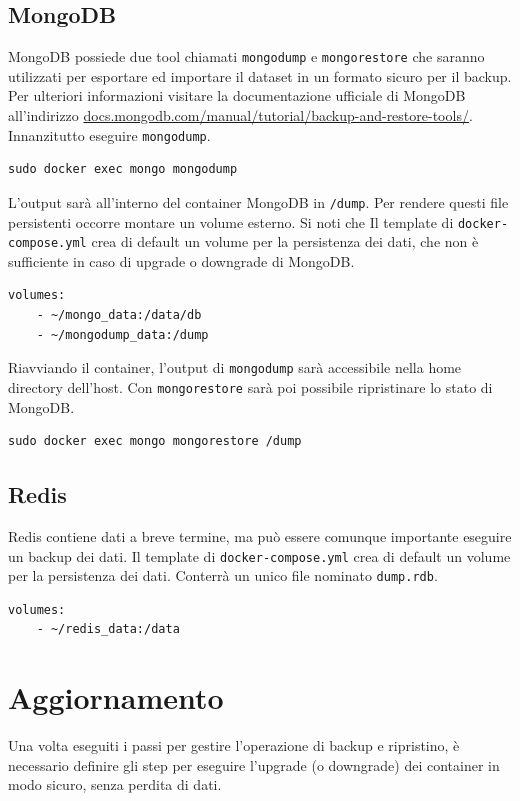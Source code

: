 \subsection{MongoDB}
MongoDB possiede due tool chiamati \verb|mongodump| e \verb|mongorestore| che saranno utilizzati per esportare ed importare il dataset in un formato sicuro per il backup. Per ulteriori informazioni visitare la documentazione ufficiale di MongoDB all'indirizzo \url{docs.mongodb.com/manual/tutorial/backup-and-restore-tools/}. Innanzitutto eseguire \verb|mongodump|.
\begin{lstlisting}
sudo docker exec mongo mongodump
\end{lstlisting}
L'output sarà all'interno del container MongoDB in \verb|/dump|. Per rendere questi file persistenti occorre montare un volume esterno. Si noti che Il template di \verb|docker-compose.yml| crea di default un volume per la persistenza dei dati, che non è sufficiente in caso di upgrade o downgrade di MongoDB.
\begin{lstlisting}
volumes:
    - ~/mongo_data:/data/db
    - ~/mongodump_data:/dump
\end{lstlisting}
Riavviando il container, l'output di \verb|mongodump| sarà accessibile nella home directory dell'host. Con \verb|mongorestore| sarà poi possibile ripristinare lo stato di MongoDB.
\begin{lstlisting}
sudo docker exec mongo mongorestore /dump
\end{lstlisting}

\subsection{Redis}
Redis contiene dati a breve termine, ma può essere comunque importante eseguire un backup dei dati. Il template di \verb|docker-compose.yml| crea di default un volume per la persistenza dei dati. Conterrà un unico file nominato \verb|dump.rdb|.
\begin{lstlisting}
volumes:
    - ~/redis_data:/data
\end{lstlisting}

\section{Aggiornamento}
Una volta eseguiti i passi per gestire l'operazione di backup e ripristino, è necessario definire gli step per eseguire l'upgrade (o downgrade) dei container in modo sicuro, senza perdita di dati.

